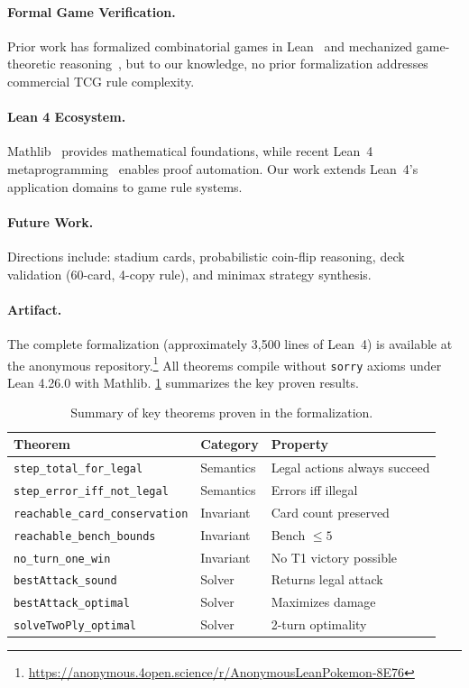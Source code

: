 \documentclass[a4paper,UKenglish,cleveref,autoref,anonymous]{lipics-v2021}
\begin{document}
\paragraph{Formal Game Verification.}
Prior work has formalized combinatorial games in Lean~\cite{LeanGames2022} and mechanized game-theoretic reasoning~\cite{Kerber2016}, but to our knowledge, no prior formalization addresses commercial TCG rule complexity.

\paragraph{Lean 4 Ecosystem.}
Mathlib~\cite{mathlib2020} provides mathematical foundations, while recent Lean~4 metaprogramming~\cite{Ullrich2022} enables proof automation.
Our work extends Lean~4's application domains to game rule systems.

\paragraph{Future Work.}
Directions include: stadium cards, probabilistic coin-flip reasoning, deck validation (60-card, 4-copy rule), and minimax strategy synthesis.

\paragraph{Artifact.}
The complete formalization (approximately 3{,}500 lines of Lean~4) is available at the anonymous repository.\footnote{\url{https://anonymous.4open.science/r/AnonymousLeanPokemon-8E76}}
All theorems compile without \texttt{sorry} axioms under Lean 4.26.0 with Mathlib.
\cref{tab:theorems} summarizes the key proven results.

\begin{table}[t]
\centering
\caption{Summary of key theorems proven in the formalization.}
\label{tab:theorems}
\small
\begin{tabular}{lll}
\hline
\textbf{Theorem} & \textbf{Category} & \textbf{Property} \\
\hline
\texttt{step\_total\_for\_legal} & Semantics & Legal actions always succeed \\
\texttt{step\_error\_iff\_not\_legal} & Semantics & Errors iff illegal \\
\texttt{reachable\_card\_conservation} & Invariant & Card count preserved \\
\texttt{reachable\_bench\_bounds} & Invariant & Bench $\leq 5$ \\
\texttt{no\_turn\_one\_win} & Invariant & No T1 victory possible \\
\texttt{bestAttack\_sound} & Solver & Returns legal attack \\
\texttt{bestAttack\_optimal} & Solver & Maximizes damage \\
\texttt{solveTwoPly\_optimal} & Solver & 2-turn optimality \\
\hline
\end{tabular}
\end{table}



\end{document}
